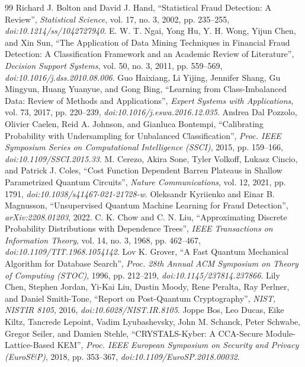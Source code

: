 \begin{thebibliography}{99}
 Richard J. Bolton and David J. Hand, \textquotedblleft{}Statistical Fraud Detection: A Review\textquotedblright{}, \textit{Statistical Science}, vol. 17, no. 3, 2002, pp. 235--255, \textit{doi:10.1214/ss/1042727940}.
 E. W. T. Ngai, Yong Hu, Y. H. Wong, Yijun Chen, and Xin Sun, \textquotedblleft{}The Application of Data Mining Techniques in Financial Fraud Detection: A Classification Framework and an Academic Review of Literature\textquotedblright{}, \textit{Decision Support Systems}, vol. 50, no. 3, 2011, pp. 559--569, \textit{doi:10.1016/j.dss.2010.08.006}.
 Guo Haixiang, Li Yijing, Jennifer Shang, Gu Mingyun, Huang Yuanyue, and Gong Bing, \textquotedblleft{}Learning from Class-Imbalanced Data: Review of Methods and Applications\textquotedblright{}, \textit{Expert Systems with Applications}, vol. 73, 2017, pp. 220--239, \textit{doi:10.1016/j.eswa.2016.12.035}.
 Andrea Dal Pozzolo, Olivier Caelen, Reid A. Johnson, and Gianluca Bontempi, \textquotedblleft{}Calibrating Probability with Undersampling for Unbalanced Classification\textquotedblright{}, \textit{Proc. IEEE Symposium Series on Computational Intelligence (SSCI)}, 2015, pp. 159--166, \textit{doi:10.1109/SSCI.2015.33}.
 M. Cerezo, Akira Sone, Tyler Volkoff, Lukasz Cincio, and Patrick J. Coles, \textquotedblleft{}Cost Function Dependent Barren Plateaus in Shallow Parametrized Quantum Circuits\textquotedblright{}, \textit{Nature Communications}, vol. 12, 2021, pp. 1791, \textit{doi:10.1038/s41467-021-21728-w}.
 Oleksandr Kyriienko and Einar B. Magnusson, \textquotedblleft{}Unsupervised Quantum Machine Learning for Fraud Detection\textquotedblright{}, \textit{arXiv:2208.01203}, 2022.
 C. K. Chow and C. N. Liu, \textquotedblleft{}Approximating Discrete Probability Distributions with Dependence Trees\textquotedblright{}, \textit{IEEE Transactions on Information Theory}, vol. 14, no. 3, 1968, pp. 462--467, \textit{doi:10.1109/TIT.1968.1054142}.
 Lov K. Grover, \textquotedblleft{}A Fast Quantum Mechanical Algorithm for Database Search\textquotedblright{}, \textit{Proc. 28th Annual ACM Symposium on Theory of Computing (STOC)}, 1996, pp. 212--219, \textit{doi:10.1145/237814.237866}.
 Lily Chen, Stephen Jordan, Yi-Kai Liu, Dustin Moody, Rene Peralta, Ray Perlner, and Daniel Smith-Tone, \textquotedblleft{}Report on Post-Quantum Cryptography\textquotedblright{}, \textit{NIST, NISTIR 8105}, 2016, \textit{doi:10.6028/NIST.IR.8105}.
 Joppe Bos, Leo Ducas, Eike Kiltz, Tancrede Lepoint, Vadim Lyubashevsky, John M. Schanck, Peter Schwabe, Gregor Seiler, and Damien Stehle, \textquotedblleft{}CRYSTALS-Kyber: A CCA-Secure Module-Lattice-Based KEM\textquotedblright{}, \textit{Proc. IEEE European Symposium on Security and Privacy (EuroS\&P)}, 2018, pp. 353--367, \textit{doi:10.1109/EuroSP.2018.00032}.

\end{thebibliography}
